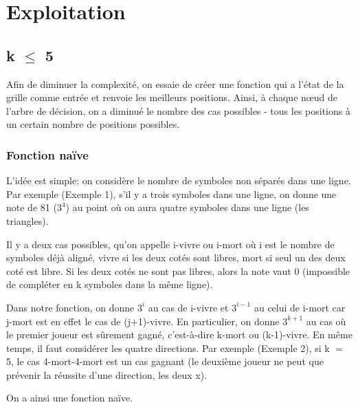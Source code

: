 \documentclass[12pt, a4paper]{article}
\begin{document}
\section{Exploitation}
\subsection{k $\le$ 5}
Afin de diminuer la complexité, on essaie de créer une fonction qui a l'état de la grille comme entrée et renvoie les meilleurs positions. Ainsi, à chaque nœud de l'arbre de décision, on a diminué le nombre des cas possibles - tous les positions à un certain nombre de positions possibles.
\subsubsection{Fonction naïve}
L'idée est simple: on considère le nombre de symboles non séparés dans une ligne. Par exemple (Exemple 1), s'il y a trois symboles dans une ligne, on donne une note de 81 ($3^{4}$) au point où on aura quatre symboles dans une ligne (les triangles).
\begin{center}
\end{center}
Il y a deux cas possibles, qu'on appelle i-vivre ou i-mort où i est le nombre de symboles déjà aligné, vivre si les deux cotés sont libres, mort si seul un des deux coté est libre. Si les deux cotés ne sont pas libres, alors la note vaut 0 (impossible de compléter en k symboles dans la même ligne).
\begin{center}
\end{center}
\begin{center}
\end{center}
Dans notre fonction, on donne $3^{i}$ au cas de i-vivre et $3^{i-1}$ au celui de i-mort car j-mort est en effet le cas de (j$+$1)-vivre. En particulier, on donne $3^{k+1}$ au cas où le premier joueur est sûrement gagné, c'est-à-dire k-mort ou (k-1)-vivre. En même temps, il faut considérer les quatre directions. Par exemple (Exemple 2), si k $=$ 5, le cas 4-mort-4-mort est un cas gagnant (le deuxième joueur ne peut que prévenir la réussite d'une direction, les deux x).
\cleargoban
\begin{center}
\end{center}
On a ainsi une fonction naïve.
\end{document}
